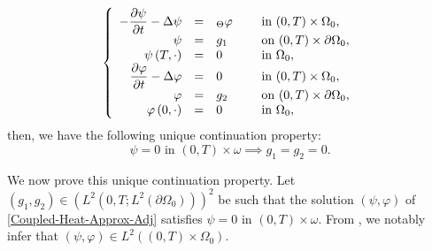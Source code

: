 \documentclass[11pt]{article}
\makeatletter
\numberwithin{equation}{section}
\DeclareRobustCommand{\mathbbm}[1]{\csname jepbb@#1\endcsname}
\theoremstyle{definition}
\makeatother
\begin{document}
\begin{equation}
\label{Coupled-Heat-Approx-Adj}
\left\{
\begin{array}{rcll}
-\dfrac{\partial \psi}{\partial t}-\Delta \psi &=&\mathbbm{1}_{\Theta}\varphi \quad&\text{ in }(0,T) \times \Omega_0,
\\
\psi &=& g_1 &\text{ on }(0,T) \times \partial \Omega_0,
\\
\psi \left(T,\cdot\right) &=& 0 &\text{ in }\Omega_0,
\\
\dfrac{\partial \varphi}{\partial t}-\Delta \varphi &=& 0 &\text{ in }(0,T) \times \Omega_0,
\\
\varphi &=& g_2 &\text{ on }(0,T) \times \partial \Omega_0,
\\
\varphi\left(0,\cdot\right) &=& 0 &\text{ in }\Omega_0,
\end{array}
\right.
\end{equation}
then, we have the following unique continuation property:
\begin{equation}
\label{UC-Adj-Coupled}
\psi = 0 \text{ in } (0,T) \times \omega \implies g_1 = g_2 = 0.
\end{equation}

We now prove this unique continuation property. Let $(g_1, g_2) \in (L^2(0,T; L^2(\partial\Omega_0)))^2$ be such that the solution $(\psi, \varphi)$ of \eqref{Coupled-Heat-Approx-Adj} satisfies $\psi = 0$ in $(0,T) \times \omega$. From \cite[(15.17--18), p.\,86]{LionsMagenes2}, we notably infer that $(\psi,\varphi)\in L^2((0,T)\times\Omega_0)$.
\end{document}
